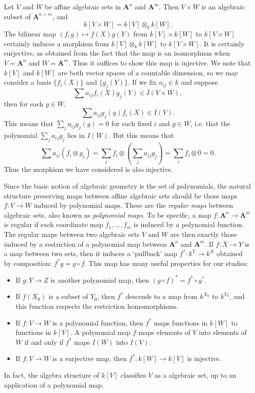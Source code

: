 \begin{example}

    Let $V$ and $W$ be affine algebraic sets in $\mathbf{A}^n$ and $\mathbf{A}^m$. Then $V \times W$ is an algebraic subset of $\mathbf{A}^{n+m}$, and
    \[ k[V \times W] = k[V] \otimes_k k[W]. \]
    The bilinear map $(f,g) \mapsto f(X)g(Y)$ from $k[V] \times k[W]$ to $k[V \times W]$ certainly induces a morphism from $k[V] \otimes_k k[W]$ to $k[V \times W]$. It is certainly surjective, as obtained from the fact that the map is an isomorphism when $V = \mathbf{A}^n$ and $W = \mathbf{A}^m$. Thus it suffices to show this map is injective. We note that $k[V]$ and $k[W]$ are both vector spaces of a countable dimension, so we may consider a basis $\{ f_i(X) \}$ and $\{ g_j(Y) \}$. If we fix $a_{ij} \in k$ and suppose
    \[ \sum a_{ij} f_i(X) g_j(Y) \in I(V \times W), \]
    then for each $y \in W$,
    \[ \sum a_{ij} g_j(y) f_i(X) \in I(V). \]
    This means that $\sum_j a_{ij} g_j(y) = 0$ for each fixed $i$ and $y \in W$, i.e. that the polynomial $\sum_j a_{ij} g_j$ lies in $I(W)$. But this means that
    \[ \sum a_{ij} (f_i \otimes g_j) = \sum_i f_i \otimes \left( \sum_j a_{ij} g_j \right) = \sum_i f_i \otimes 0 = 0. \]
    Thus the morphism we have considered is also injective.
\end{example}

Since the basic notion of algebraic geometry is the set of polynomials, the natural structure preserving maps between affine algebraic sets should be those maps $f: V \to W$ induced by polynomial maps. These are the \emph{regular maps} between algebraic sets, also known as \emph{polynomial maps}. To be specific, a map $f: \mathbf{A}^n \to \mathbf{A}^m$ is regular if each coordinate map $f_1, \dots, f_m$ is induced by a polynomial function. The regular maps between two algebraic sets $V$ and $W$ are then exactly those induced by a restriction of a polynomial map between $\mathbf{A}^n$ and $\mathbf{A}^m$. If $f: X \to Y$ is a map between two sets, then it induces a `pullback' map $f^*: k^Y \to k^X$ obtained by composition: $f^*g = g \circ f$. This map has many useful properties for our studies:
%
\begin{itemize}
    \item If $g: Y \to Z$ is another polynomial map, then $(g \circ f)^* = f^* \circ g^*$.
    \item If $f(X_0)$ is a subset of $Y_0$, then $f^*$ descends to a map from $k^{X_0}$ to $k^{Y_0}$, and this function respects the restriction homomorphisms.
    \item If $f: V \to W$ is a polynomial function, then $f^*$ maps functions in $k[W]$ to functions in $k[V]$. A polynomial map $f$ maps elements of $V$ into elements of $W$ if and only if $f^*$ maps $I(W)$ into $I(V)$.
    \item If $f: V \to W$ is a surjective map, then $f^*: k[W] \to k[V]$ is injective.
\end{itemize}
%
In fact, the algebra structure of $k[V]$ classifies $V$ as a algebraic set, up to an application of a polynomial map.

